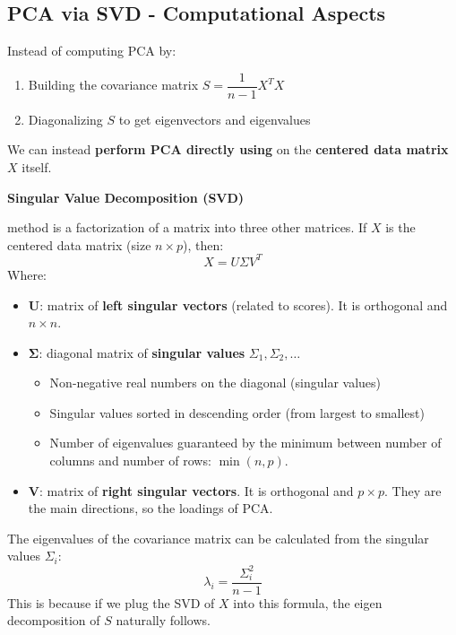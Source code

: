 \subsection{PCA via SVD - Computational Aspects}

Instead of computing PCA by:
\begin{enumerate}
    \item Building the covariance matrix $ S = \dfrac{1}{n-1} X^{T} X $
    \item Diagonalizing $S$ to get eigenvectors and eigenvalues
\end{enumerate}
We can instead \textbf{perform PCA directly using}  on the \textbf{centered data matrix} $X$ itself.

\highspace
\begin{flushleft}
    \textcolor{Green3}{ \textbf{Singular Value Decomposition (SVD)}}
\end{flushleft}
 method is a factorization of a matrix into three other matrices. If $X$ is the centered data matrix (size $n \times p$), then:
\begin{equation}
    X = U \Sigma V^{T}
\end{equation}
Where:
\begin{itemize}
    \item $\mathbf{U}$: matrix of \textbf{left singular vectors} (related to scores). It is orthogonal and $n \times n$.
    \item $\boldsymbol{\Sigma}$: diagonal matrix of \textbf{singular values} $ \Sigma_{1}, \Sigma_{2}, \dots$
    \begin{itemize}
        \item Non-negative real numbers on the diagonal (singular values)
        \item Singular values sorted in descending order (from largest to smallest)
        \item Number of eigenvalues guaranteed by the minimum between number of columns and number of rows: $\min\left(n, p\right)$.
    \end{itemize}
    \item $\mathbf{V}$: matrix of \textbf{right singular vectors}. It is orthogonal and $p \times p$. They are the main directions, so the loadings of PCA.
\end{itemize}
The eigenvalues of the covariance matrix can be calculated from the singular values $\Sigma_{i}$:
\begin{equation*}
    \lambda_{i} = \dfrac{\Sigma_{i}^{2}}{n-1}
\end{equation*}
This is because if we plug the SVD of $X$ into this formula, the eigen decomposition of $S$ naturally follows.

